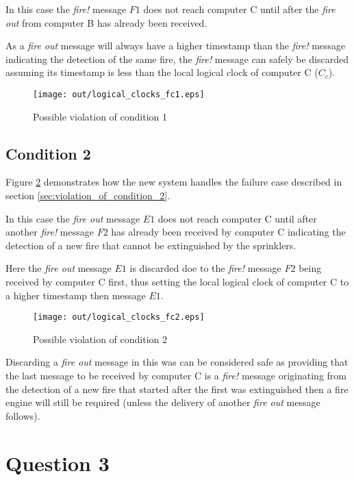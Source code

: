 \documentclass[twocolumn]{article}
\begin{document}
In this case the \textit{fire!} message $F1$ does not reach computer C until
after the \textit{fire out} from computer B has already been received.

As a \textit{fire out} message will always have a higher timestamp than the
\textit{fire!} message indicating the detection of the same fire, the
\textit{fire!} message can safely be discarded assuming its timestamp is less
than the local logical clock of computer C ($C_{c}$).

\begin{figure}[h!]
  \centering
  \texttt{[image: out/logical\_clocks\_fc1.eps]}
  \caption{Possible violation of condition 1}
  \label{fig:logical_clocks_fc1}
\end{figure}

\subsection{Condition 2}

Figure \ref{fig:logical_clocks_fc2} demonstrates how the new system handles the
failure case described in section \ref{sec:violation_of_condition_2}.

In this case the \textit{fire out} message $E1$ does not reach computer C until
after another \textit{fire!} message $F2$ has already been received by computer
C indicating the detection of a new fire that cannot be extinguished by the
sprinklers.

Here the \textit{fire out} message $E1$ is discarded doe to the \textit{fire!}
message $F2$ being received by computer C first, thus setting the local logical
clock of computer C to a higher timestamp then message $E1$.

\begin{figure}[h!]
  \centering
  \texttt{[image: out/logical\_clocks\_fc2.eps]}
  \caption{Possible violation of condition 2}
  \label{fig:logical_clocks_fc2}
\end{figure}

Discarding a \textit{fire out} message in this was can be considered safe as
providing that the last message to be received by computer C is a \textit{fire!}
message originating from the detection of a new fire that started after the
first was extinguished then a fire engine will still be required (unless the
delivery of another \textit{fire out} message follows).

\section{Question 3}
\end{document}

